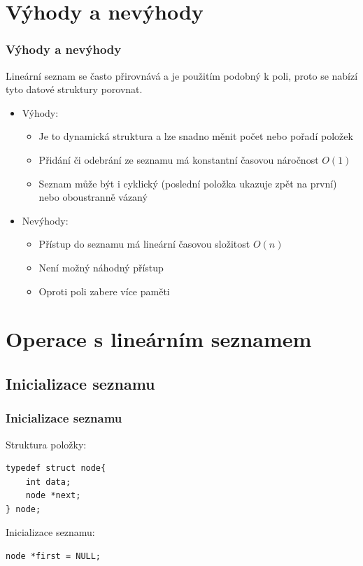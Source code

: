 \documentclass{beamer}
\begin{document}
\section{Výhody a nevýhody}
\begin{frame}
\frametitle{Výhody a nevýhody}
Lineární seznam se často přirovnává a je použitím podobný k poli, proto se nabízí tyto datové struktury porovnat.
\pause

\begin{itemize}
    \item Výhody:
    \begin{itemize}
        \item Je to dynamická struktura a lze snadno měnit počet nebo pořadí položek
        \item Přidání či odebrání ze seznamu má konstantní časovou náročnost $O(1)$
        \item Seznam může být i cyklický (poslední položka ukazuje zpět na první) nebo oboustranně vázaný
    \end{itemize}
    \pause
    \item Nevýhody:
    \begin{itemize}
        \item Přístup do seznamu má lineární časovou složitost $O(n)$
        \item Není možný náhodný přístup
        \item Oproti poli zabere více paměti
    \end{itemize}
\end{itemize}
\end{frame} 

\section{Operace s lineárním seznamem}
\subsection{Inicializace seznamu}
\begin{frame}[fragile]
\frametitle{Inicializace seznamu}
Struktura položky:
\begin{verbatim}
typedef struct node{
    int data;
    node *next;
} node;
\end{verbatim}
\bigskip

Inicializace seznamu:
\begin{verbatim}
node *first = NULL;
\end{verbatim}
\end{frame}
\end{document}

